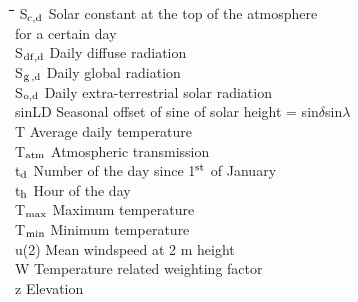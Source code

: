 \documentclass[11pt]{article}
\begin{document}
\begin{tabbing}
\hspace{1.27cm}\=\hspace{1.27cm}\=\hspace{1.27cm}\=\hspace{1.27cm}\=%
\hspace{1.27cm}\=\hspace{1.27cm}\=\hspace{1.27cm}\=\hspace{1.27cm}\=%
\hspace{1.27cm}\=\hspace{1.27cm}\=\kill
S$_{{\rm c,d}}$\> \> Solar constant at the top of the atmosphere\\
\>\> for a certain day\> \> \> \> \> \> \> \> [J m$^{{\rm -2}}$ s$^{{\rm -1}}$]\\
S$_{{\rm df,d}}$\> \> Daily diffuse radiation\> \> \> \> \> \> \> \> [J m$^{{\rm -2}}$ d$^{{\rm -1}}$]\\
S$_{{\rm g}}$$_{{\rm ,d}}$\> \> Daily global radiation\> \> \> \> \> \> \> \> [J m$^{{\rm -2}}$ d$^{{\rm -1}}$]\\
S$_{{\rm o,d}}$\> \> Daily extra-terrestrial solar radiation \> \> \> \> \> \> \> \> [J m$^{{\rm -2}}$ s$^{{\rm -1}}$]\\
sinLD\> \> Seasonal offset of sine of solar height = sin$\delta$sin$\lambda$\> \> \> \> \> \> \> \> [-]\\
T\> \> Average daily temperature\> \> \> \> \> \> \> \> [\degrees C]\\
T$_{{\rm atm}}$\> \> Atmospheric transmission\> \> \> \> \> \> \> \> [-]\\
t$_{{\rm d}}$\> \> Number of the day since 1$^{{\rm st}}$ of January\> \> \> \> \> \> \> \> [-]\\
t$_{{\rm h}}$\> \> Hour of the day\> \> \> \> \> \> \> \> [hr]\\
T$_{{\rm max}}$\> \> Maximum temperature\> \> \> \> \> \> \> \> [\degrees C]\\
T$_{{\rm min}}$\> \> Minimum temperature\> \> \> \> \> \> \> \> [\degrees C]\\
u(2)\> \> Mean windspeed at 2 m height\> \> \> \> \> \> \> \> [m s$^{{\rm -1}}$]\\
W\> \> Temperature related weighting factor\> \> \> \> \> \> \> \> [-]\\
z\> \> Elevation\> \> \> \> \> \> \> \> [m]
\end{tabbing}
\end{document}
